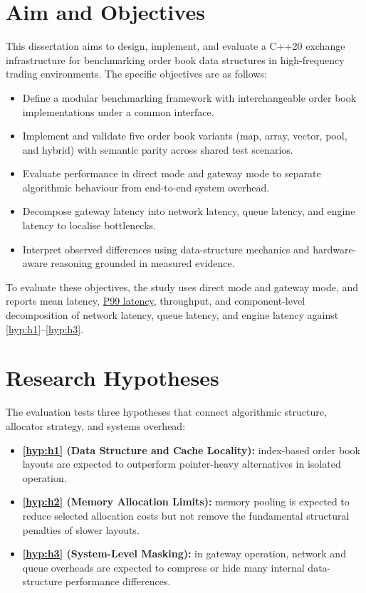 \section{Aim and Objectives}
This dissertation aims to design, implement, and evaluate a C++20 exchange 
infrastructure for benchmarking order book data structures in high-frequency 
trading environments. 
The specific objectives are as follows:

\begin{itemize}
  \item Define a modular benchmarking framework with interchangeable order book
  implementations under a common interface.
  \item Implement and validate five order book variants (map, array, vector,
  pool, and hybrid) with semantic parity across shared test scenarios.
  \item Evaluate performance in direct mode and gateway mode to separate
  algorithmic behaviour from end-to-end system overhead.
  \item Decompose gateway latency into network latency, queue latency, and
  engine latency to localise bottlenecks.
  \item Interpret observed differences using data-structure mechanics and
  hardware-aware reasoning grounded in measured evidence.
\end{itemize}

To evaluate these objectives, the study uses direct mode and gateway mode, and
reports mean latency, \hyperref[app:glossary]{P99 latency}, throughput, and component-level decomposition
of network latency, queue latency, and engine latency against
\ref{hyp:h1}--\ref{hyp:h3}.


\section{Research Hypotheses}
The evaluation tests three hypotheses that connect algorithmic structure,
allocator strategy, and systems overhead:

\begin{itemize}
  \item \textbf{\ref{hyp:h1} (Data Structure and Cache Locality):} index-based
  order book layouts are expected to outperform pointer-heavy alternatives in
  isolated operation.
  \item \textbf{\ref{hyp:h2} (Memory Allocation Limits):} memory pooling is
  expected to reduce selected allocation costs but not remove the fundamental
  structural penalties of slower layouts.
  \item \textbf{\ref{hyp:h3} (System-Level Masking):} in gateway operation,
  network and queue overheads are expected to compress or hide many internal
  data-structure performance differences.
\end{itemize}

